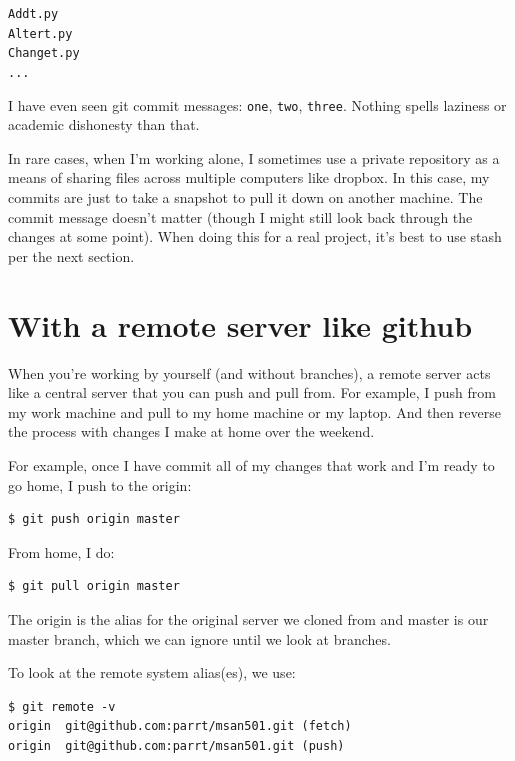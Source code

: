 \begin{fullwidth}
\begin{alltt}
Add t.py
Alter t.py
Change t.py
...
\end{alltt}

I have even seen git commit messages: {\tt one}, {\tt two}, {\tt three}. Nothing spells laziness or academic dishonesty than that.

In rare cases, when I'm working alone, I sometimes use a private repository as a means of sharing files across multiple computers like dropbox. In this case, my commits are just to take a snapshot to pull it down on another machine. The commit message doesn't matter (though I might still look back through the changes at some point). When doing this for a real project, it's best to use stash per the next section.

\section{With a remote server like github}

When you're working by yourself (and without branches), a remote server acts like a central server that you can push and pull from. For example, I push from my work machine and pull to my home machine or my laptop. And then reverse the process with changes I make at home over the weekend.

For example, once I have commit all of my changes that work and I'm ready to go home, I push to the origin:

\begin{lstlisting}[style=BashInputStyle]
$ git push origin master
\end{lstlisting}

\noindent From home, I do:

\begin{lstlisting}[style=BashInputStyle]
$ git pull origin master
\end{lstlisting}

\noindent The origin is the alias for the original server we cloned from and master is our master branch, which we can ignore until we look at branches.

To look at the remote system alias(es), we use:

\begin{lstlisting}[style=BashInputStyle]
$ git remote -v
origin  git@github.com:parrt/msan501.git (fetch)
origin  git@github.com:parrt/msan501.git (push)
\end{lstlisting}

\end{fullwidth}
